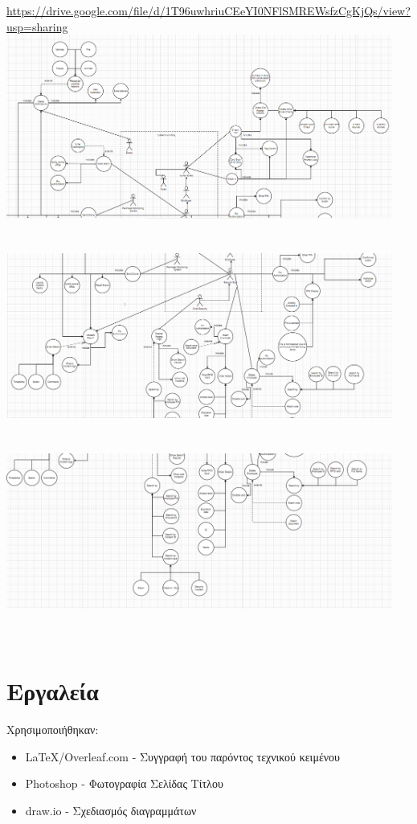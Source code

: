 \documentclass{article}
\begin{document}
\url{https://drive.google.com/file/d/1T96uwhriuCEeYI0NFlSMREWsfzCgKjQs/view?usp=sharing}
\\
\includegraphics[width=5in]{use1}\\[1ex]\\\\
\includegraphics[width=5in]{use2}\\[1ex]\\\\
\includegraphics[width=5in]{use3}\\[1ex]\\\\


\section{Εργαλεία}
Χρησιμοποιήθηκαν:
\begin{itemize}
    \item \LaTeX/Overleaf.com - Συγγραφή του παρόντος τεχνικού κειμένου
    \item Photoshop - Φωτογραφία Σελίδας Τίτλου
    \item draw.io - Σχεδιασμός διαγραμμάτων
\end{itemize}
\end{document}
